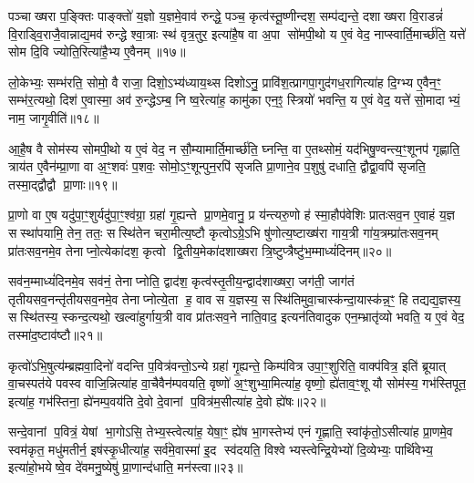 पञ्चाख्षरा प॒ङ्क्तिः पाङ्क्तो॑ य॒ज्ञो य॒ज्ञमे॒वाव॑ रुन्द्धे॒ पञ्च॒ कृत्व॑स्तू॒ष्णीन्दश॒ सम्प॑द्यन्ते॒ दशाख्षरा वि॒राडन्नं॑ वि॒राड्वि॒राजै॒वान्नाद्य॒मव॑ रुन्द्धे श्वा॒त्राः स्थ॑ वृत्र॒तुर॒ इत्या॑है॒ष वा अ॒पा सो॑मपी॒थो य ए॒वं वेद॒ नाप्स्वार्ति॒मार्च्छ॑ति॒ यत्ते॑ सोम दि॒वि ज्योति॒रित्या॑है॒भ्य ए॒वैनम्॥१७॥

लो॒केभ्यः॒ सम्भ॑रति॒ सोमो॒ वै राजा॒ दिशो॒ऽभ्य॑ध्याय॒थ्स दिशोऽनु॒ प्रावि॑श॒त्प्रागपा॒गुद॑गध॒रागित्या॑ह दि॒ग्भ्य ए॒वैन॒ꣳ॒ सम्भ॑र॒त्यथो॒ दिश॑ ए॒वास्मा॒ अव॑ रु॒न्द्धेऽम्ब॒ नि ष्व॒रेत्या॑ह॒ कामु॑का एन॒ꣵ॒ स्त्रियो॑ भवन्ति॒ य ए॒वं वेद॒ यत्ते॑ सो॒मादाभ्यं॒ नाम॒ जागृ॒वीति॑॥१८॥

आ॒है॒ष वै सोम॑स्य सोमपी॒थो य ए॒वं वेद॒ न सौ॒म्यामार्ति॒मार्च्छ॑ति॒ घ्नन्ति॒ वा ए॒तथ्सोमं॒ यद॑भिषु॒ण्वन्त्य॒ꣳ॒शूनप॑ गृह्णाति॒ त्राय॑त ए॒वैन॑म्प्रा॒णा वा अ॒ꣳ॒शवः॑ प॒शवः॒ सोमो॒ऽꣳ॒शून्पुन॒रपि॑ सृजति प्रा॒णाने॒व प॒शुषु॑ दधाति॒ द्वौद्वा॒वपि॑ सृजति॒ तस्मा॒द्द्वौद्वौ प्रा॒णाः॥१९॥

{\anuvakamend[{यजु॑षा मिमीत एनं॒ जागृ॒वीति॒ चतु॑श्चत्वारिशच्च॥४॥}]}

प्रा॒णो वा ए॒ष यदु॑पा॒ꣳ॒शुर्यदु॑पा॒ꣳ॒श्व॑ग्रा॒ ग्रहा॑ गृ॒ह्यन्ते प्रा॒णमे॒वानु॒ प्र य॑न्त्यरु॒णो ह॑ स्मा॒हौप॑वेशिः प्रातःसव॒न ए॒वाहं य॒ज्ञ सस्था॑पयामि॒ तेन॒ ततः॒ सस्थि॑तेन चरा॒मीत्य॒ष्टौ कृत्वोऽग्रे॒ऽभि षु॑णोत्य॒ष्टाख्ष॑रा गाय॒त्री गा॑य॒त्रम्प्रा॑तःसव॒नम् प्रा॑तःसव॒नमे॒व तेनाप्नो॒त्येका॑दश॒ कृत्वो द्वि॒तीय॒मेका॑दशाख्षरा त्रि॒ष्टुप्त्रैष्टु॑भ॒म्माध्यं॑दिनम्॥२०॥

सव॑न॒म्माध्यं॑दिनमे॒व सव॑नं॒ तेनाप्नोति॒ द्वाद॑श॒ कृत्व॑स्तृ॒तीय॒न्द्वाद॑शाख्षरा॒ जग॑ती॒ जाग॑तं तृतीयसव॒नन्तृ॑तीयसव॒नमे॒व तेनाप्नोत्ये॒ता ह॒ वाव स य॒ज्ञस्य॒ सस्थि॑तिमुवा॒चास्क॑न्दा॒यास्क॑न्न॒ꣳ॒ हि तद्यद्य॒ज्ञस्य॒ सस्थि॑तस्य॒ स्कन्द॒त्यथो॒ खल्वा॑हुर्गाय॒त्री वाव प्रा॑तःसव॒ने नाति॒वाद॒ इत्यन॑तिवादुक एन॒म्भ्रातृ॑व्यो भवति॒ य ए॒वं वेद॒ तस्मा॑द॒ष्टाव॑ष्टौ॥२१॥

कृत्वो॑ऽभि॒षुत्य॑म्ब्रह्मवा॒दिनो॑ वदन्ति प॒वित्र॑वन्तो॒ऽन्ये ग्रहा॑ गृ॒ह्यन्ते॒ किम्प॑वित्र उपा॒ꣳ॒शुरिति॒ वाक्प॑वित्र॒ इति॑ ब्रूयात् वा॒चस्पत॑ये पवस्व वाजि॒न्नित्या॑ह वा॒चैवैन॑म्पवयति॒ वृष्णो॑ अ॒ꣳ॒शुभ्या॒मित्या॑ह॒ वृष्णो॒ ह्ये॑ताव॒ꣳ॒शू यौ सोम॑स्य॒ गभ॑स्तिपूत॒ इत्या॑ह॒ गभ॑स्तिना॒ ह्ये॑नम्प॒वय॑ति दे॒वो दे॒वानां प॒वित्र॑म॒सीत्या॑ह दे॒वो ह्ये॑षः॥२२॥

सन्दे॒वानां प॒वित्रं॒ येषां भा॒गोऽसि॒ तेभ्य॒स्त्वेत्या॑ह॒ येषा॒ꣳ॒ ह्ये॑ष भा॒गस्तेभ्य॑ एनं गृ॒ह्णाति॒ स्वांकृ॑तो॒ऽसीत्या॑ह प्रा॒णमे॒व स्वम॑कृत॒ मधु॑मतीर्न॒ इष॑स्कृ॒धीत्या॑ह॒ सर्व॑मे॒वास्मा॑ इ॒द स्व॑दयति॒ विश्वेभ्यस्त्वेन्द्रि॒येभ्यो॑ दि॒व्येभ्यः॒ पार्थि॑वेभ्य॒ इत्या॑हो॒भयेष्वे॒व दे॑वमनु॒ष्येषु॑ प्रा॒णान्द॑धाति॒ मन॑स्त्वा॥२३॥

